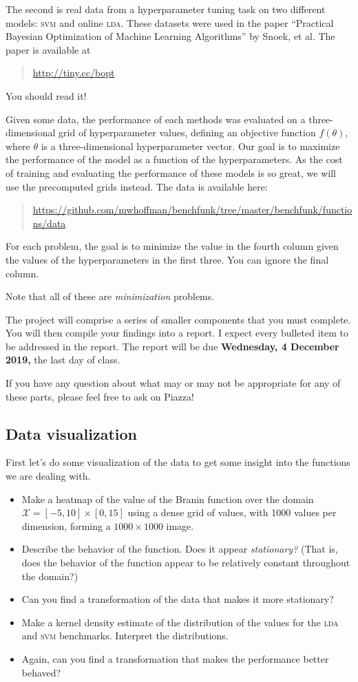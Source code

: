 \documentclass{article}
\newcommand{\acro}[1]{\textsc{\MakeLowercase{#1}}}
\newcommand{\mc}[1]{\mathcal{#1}}
\begin{document}
The second is real data from a hyperparameter tuning task on two different
models: \acro{SVM} and online \acro{LDA}. These datasets were used in the paper
``Practical Bayesian Optimization of Machine Learning Algorithms'' by Snoek, et
al. The paper is available at
\begin{quote}
  \url{http://tiny.cc/bopt}
\end{quote}
You should read it!

Given some data, the performance of each methods was evaluated on a
three-dimensional grid of hyperparameter values, defining an objective function
$f(\theta)$, where $\theta$ is a three-dimensional hyperparameter vector. Our
goal is to maximize the performance of the model as a function of the
hyperparameters.  As the cost of training and evaluating the performance of
these models is so great, we will use the precomputed grids instead. The data is
available here:
\begin{quote}
  \url{https://github.com/mwhoffman/benchfunk/tree/master/benchfunk/functions/data}
\end{quote}
For each problem, the goal is to minimize the value in the fourth column given
the values of the hyperparameters in the first three. You can ignore the final
column.

Note that all of these are \emph{minimization} problems.

The project will comprise a series of smaller components that you must
complete. You will then compile your findings into a report. I expect every
bulleted item to be addressed in the report. The report will be due
\textbf{Wednesday, 4 December 2019,} the last day of class.

If you have any question about what may or may not be appropriate for any of
these parts, please feel free to ask on Piazza!

\subsection*{Data visualization}

First let's do some visualization of the data to get some insight into the
functions we are dealing with.

\begin{itemize}
\item
  Make a heatmap of the value of the Branin function over the domain $\mc{X} =
  [-5, 10] \times [0, 15]$ using a dense grid of values, with 1000 values per
  dimension, forming a $1000 \times 1000$ image.
\item
  Describe the behavior of the function. Does it appear \emph{stationary?} (That
  is, does the behavior of the function appear to be relatively constant
  throughout the domain?)
\item Can you find a transformation of the data that makes it more stationary?
\item
  Make a kernel density estimate of the distribution of the values for the
  \acro{LDA} and \acro{SVM} benchmarks. Interpret the distributions.
\item
  Again, can you find a transformation that makes the performance better
  behaved?
\end{itemize}
\end{document}

